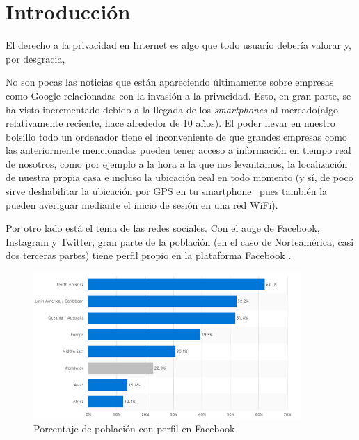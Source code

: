 \chapter{Introducción} 
\label{chap:intro}

\vspace{-0.2cm}

El derecho a la privacidad en Internet es algo que todo usuario
debería valorar y, por desgracia, 

No son pocas las noticias que están apareciendo últimamente sobre
empresas como Google relacionadas con la invasión a la
privacidad. Esto, en gran parte, se ha visto incrementado debido a la
llegada de los \textit{smartphones} al mercado(algo relativamente
reciente, hace alrededor de 10 años). El poder llevar en nuestro
bolsillo todo un ordenador tiene el inconveniente de que grandes
empresas como las anteriormente mencionadas pueden tener acceso a
información en tiempo real de nosotros, como por ejemplo a la hora a
la que nos levantamos, la localización de nuestra propia casa e
incluso la ubicación real en todo momento (y sí, de poco sirve
deshabilitar la ubicación por GPS en tu smartphone~\cite{book:GPSTracking} pues también la
pueden averiguar mediante el inicio de sesión en una red WiFi).

Por otro lado está el tema de las redes sociales. Con el auge de
Facebook, Instagram y Twitter, gran parte de la población (en el caso
de Norteamérica, casi dos terceras partes) tiene perfil propio en la
plataforma Facebook .

\begin{figure}[h]
	\centerline{
		\mbox{\includegraphics[width=4.00in]{images/sn.png}}
	}
	\caption{Porcentaje de población con perfil en Facebook~\cite{article:FacebookStats} }
	\label{fig:FBStats}
\end{figure}

